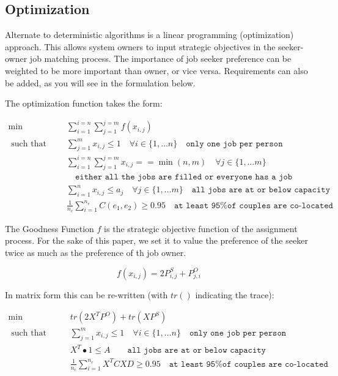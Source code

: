 \subsection{Optimization}

Alternate to deterministic algorithms is a linear programming (optimization) approach. This allows system owners to input strategic objectives in the seeker-owner job matching process. The importance of job seeker preference can be weighted to be more important than owner, or vice versa. Requirements can also be added, as you will see in the formulation below.

The optimization function takes the form:

\begin{align}
\min \qquad & \sum_{i = 1}^{i=n} \sum_{j = 1}^{j=m} f(x_{i,j}) \\
\text{ such that } \qquad & \sum_{j=1}^m x_{i,j} \leq 1 \quad  \forall i \in \{1, \dots n\} \quad \texttt{only one job per person} \\
& \sum_{i = 1}^{i=n} \sum_{j = 1}^{j=m}x_{i,j} == \min(n,m) \quad  \forall j \in \{1, \dots m\} \\& \quad \texttt{either all the jobs are filled or everyone has a job} \\
& \sum_{i=1}^n x_{i,j} \leq a_j \quad  \forall j \in \{1, \dots m\} \quad \texttt{all jobs are at or below capacity} \\
& \frac{1}{n_c} \sum_{i=1}^{n_e} C(e_1, e_2) \geq 0.95 \quad \texttt{at least 95\% of couples are co-located}
\end{align}

The Goodness Function $f$ is the strategic objective function of the assignment process. For the sake of this paper, we set it to value the preference of the seeker twice as much as the preference of th job owner.

\[f(x_{i,j}) = 2P^S_{i,j} + P^O_{j,i}\]

In matrix form this can be re-written (with $tr()$ indicating the trace):

\begin{align}
\min \qquad & tr(2X^TP^O) + tr(XP^S) \\
\text{ such that } \qquad & \sum_{j=1}^m x_{i,j} \leq 1 \quad  \forall i \in \{1, \dots n\} \quad \texttt{only one job per person} \\
& X^T \bullet 1 \leq A \quad \quad \texttt{all jobs are at or below capacity} \\
& \frac{1}{n_c} \sum_{i=1}^{n_e} X^TCXD \geq 0.95 \quad \texttt{at least 95\% of couples are co-located}
\end{align}


